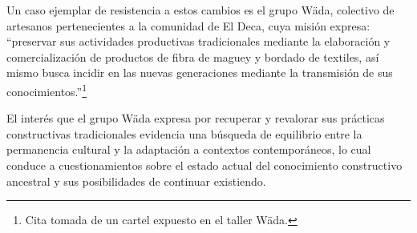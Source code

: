 Un caso ejemplar de resistencia a estos cambios es el grupo Wäda, colectivo de artesanos pertenecientes a la comunidad de El Deca, cuya misión expresa: \enquote{preservar sus actividades productivas tradicionales mediante la elaboración y comercialización de productos de fibra de maguey y bordado de textiles, así mismo busca incidir en las nuevas generaciones mediante la transmisión de sus conocimientos.}\footnote{Cita tomada de un cartel expuesto en el taller Wäda.}

El interés que el grupo Wäda expresa por recuperar y revalorar sus prácticas constructivas tradicionales evidencia una búsqueda de equilibrio entre la permanencia cultural y la adaptación a contextos contemporáneos, lo cual conduce a cuestionamientos sobre el estado actual del conocimiento constructivo ancestral y sus posibilidades de continuar existiendo.
